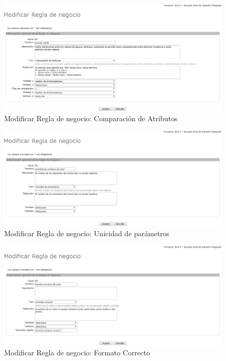 \begin{enumerate}
		\begin{figure}[H]
			\begin{center}
				\includegraphics[scale=0.5]{roles/lider/reglasNegocio/pantallas/IU8-2AmodificarBR}
				\caption{Modificar Regla de negocio: Comparación de Atributos}
				\label{fig:modificarBRA}
			\end{center}
		\end{figure}
		
		\begin{figure}[H]
			\begin{center}
				\includegraphics[scale=0.5]{roles/lider/reglasNegocio/pantallas/IU8-2BmodificarBR}
				\caption{Modificar Regla de negocio: Unicidad de parámetros}
				\label{fig:modificarBRB}
			\end{center}
		\end{figure}
		
		\begin{figure}[H]
			\begin{center}
				\includegraphics[scale=0.5]{roles/lider/reglasNegocio/pantallas/IU8-2CmodificarBR}
				\caption{Modificar Regla de negocio: Formato Correcto}
				\label{fig:modificarBRC}
			\end{center}
		\end{figure}
						

\end{enumerate}
